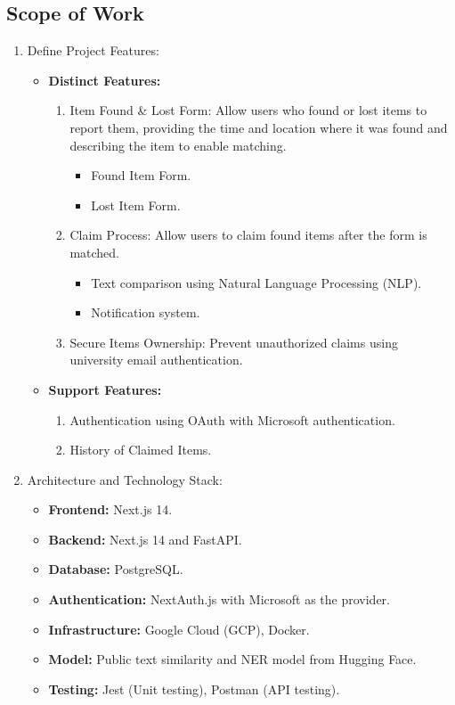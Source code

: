 \subsection{Scope of Work}
\begin{enumerate}
    \item Define Project Features:
    \begin{itemize}
        \item \textbf{Distinct Features:}
        \begin{enumerate}
            \item Item Found \& Lost Form: Allow users who found or lost items to report them, providing the time and location where it was found and describing the item to enable matching.
                \begin{itemize}
                    \item Found Item Form.
                    \item Lost Item Form.
                \end{itemize}
            \item Claim Process: Allow users to claim found items after the form is matched.
                \begin{itemize}
                    \item Text comparison using Natural Language Processing (NLP).
                    \item Notification system.
                \end{itemize}
            \item Secure Items Ownership: Prevent unauthorized claims using university email authentication.
        \end{enumerate}
        \item \textbf{Support Features:}
        \begin{enumerate}
            \item Authentication using OAuth with Microsoft authentication.
            \item History of Claimed Items.
        \end{enumerate}
    \end{itemize}
    \item Architecture and Technology Stack:
    \begin{itemize}
        \item \textbf{Frontend:} Next.js 14.
        \item \textbf{Backend:} Next.js 14 and FastAPI.
        \item \textbf{Database:} PostgreSQL.
        \item \textbf{Authentication:} NextAuth.js with Microsoft as the provider.
        \item \textbf{Infrastructure:} Google Cloud (GCP), Docker.
        \item \textbf{Model:} Public text similarity and NER model from Hugging Face.
        \item \textbf{Testing:} Jest (Unit testing), Postman (API testing).
    \end{itemize}
\end{enumerate}

